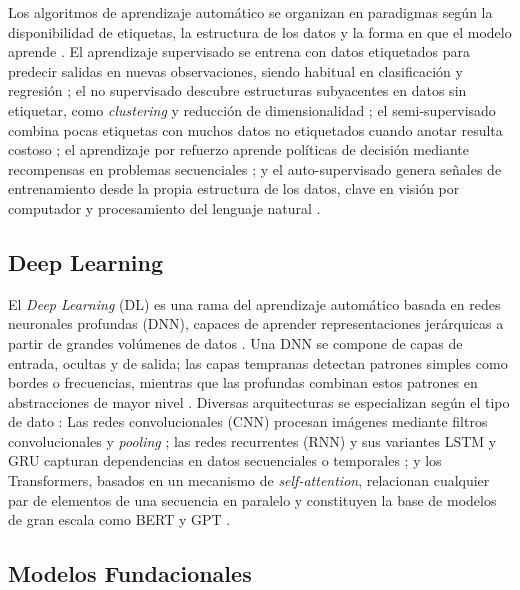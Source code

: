 Los algoritmos de aprendizaje automático se organizan en paradigmas según la disponibilidad de etiquetas, la estructura de los datos y la forma en que el modelo aprende \parencite{Liam_2025,9941371}. El aprendizaje supervisado se entrena con datos etiquetados para predecir salidas en nuevas observaciones, siendo habitual en clasificación y regresión \parencite{sarker2021machine}; el no supervisado descubre estructuras subyacentes en datos sin etiquetar, como \textit{clustering} y reducción de dimensionalidad \parencite{sarker2021machine}; el semi-supervisado combina pocas etiquetas con muchos datos no etiquetados cuando anotar resulta costoso \parencite{9941371}; el aprendizaje por refuerzo aprende políticas de decisión mediante recompensas en problemas secuenciales \parencite{murphy2025reinforcementlearningoverview}; y el auto-supervisado genera señales de entrenamiento desde la propia estructura de los datos, clave en visión por computador y procesamiento del lenguaje natural \parencite{gui2024surveyselfsupervisedlearningalgorithms}.

\subsection{Deep Learning}

El \textit{Deep Learning} (DL) es una rama del aprendizaje automático basada en redes neuronales profundas (DNN), capaces de aprender representaciones jerárquicas a partir de grandes volúmenes de datos \parencite{sarker2021deep}. Una DNN se compone de capas de entrada, ocultas y de salida; las capas tempranas detectan patrones simples como bordes o frecuencias, mientras que las profundas combinan estos patrones en abstracciones de mayor nivel \parencite{mclanddl,lecun2015deep}. Diversas arquitecturas se especializan según el tipo de dato \parencite{shiri2023comprehensive}: Las redes convolucionales (CNN) procesan imágenes mediante filtros convolucionales y \textit{pooling} \parencite{lecun2015deep}; las redes recurrentes (RNN) y sus variantes LSTM y GRU capturan dependencias en datos secuenciales o temporales \parencite{shiri2023comprehensive}; y los Transformers, basados en un mecanismo de \textit{self-attention}, relacionan cualquier par de elementos de una secuencia en paralelo y constituyen la base de modelos de gran escala como BERT y GPT \parencite{vaswani2017attention,bengio2021deep}.

\subsection{Modelos Fundacionales}

